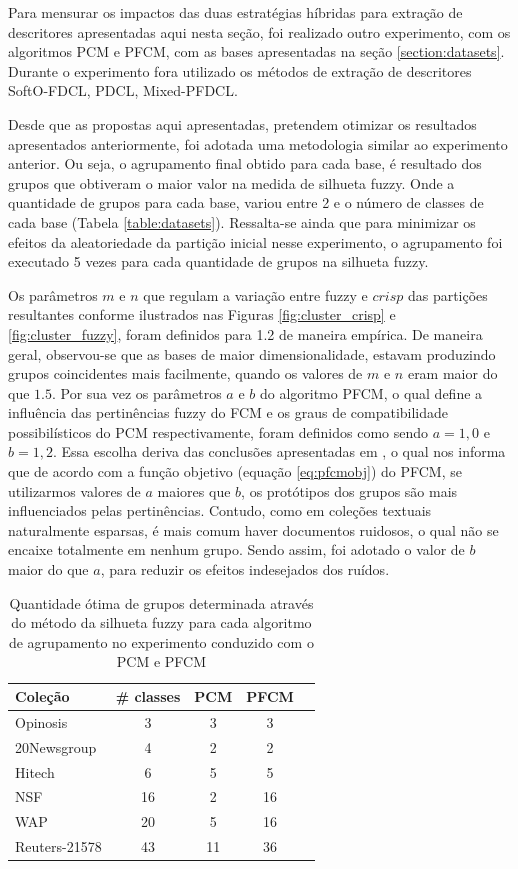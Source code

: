 Para mensurar os impactos das duas estratégias híbridas para extração de descritores apresentadas
aqui nesta seção, foi realizado outro experimento, com os algoritmos PCM e PFCM, com as bases
apresentadas na seção \ref{section:datasets}. Durante o experimento fora utilizado os métodos de
extração de descritores SoftO-FDCL, PDCL, Mixed-PFDCL. 

Desde que as propostas aqui apresentadas, pretendem otimizar os resultados apresentados
anteriormente, foi adotada uma metodologia similar ao experimento anterior. Ou seja, o agrupamento
final obtido para cada base, é resultado dos grupos que obtiveram o maior valor na medida de
silhueta fuzzy. Onde a quantidade de grupos para cada base, variou entre 2 e o número de classes
de cada base (Tabela \ref{table:datasets}). Ressalta-se ainda que para minimizar os efeitos da
aleatoriedade da partição inicial nesse experimento, o agrupamento foi executado 5 vezes para cada
quantidade de grupos na silhueta fuzzy. 

Os parâmetros $m$ e $n$ que regulam a variação entre fuzzy e $crisp$ das partições resultantes
conforme ilustrados nas Figuras \ref{fig:cluster_crisp} e \ref{fig:cluster_fuzzy}, foram definidos
para 1.2 de maneira empírica. De maneira geral, observou-se que as bases de maior dimensionalidade,
estavam produzindo grupos coincidentes mais facilmente, quando os valores de $m$ e $n$ eram maior do
que $1.5$. Por sua vez os parâmetros $a$ e $b$ do algoritmo PFCM, o qual define a influência das
pertinências fuzzy do FCM e os graus de compatibilidade possibilísticos do PCM respectivamente,
foram definidos como sendo $a = 1,0$ e $b = 1,2$. Essa escolha deriva das conclusões apresentadas
em , o qual nos informa que de acordo com a função objetivo (equação
\ref{eq:pfcmobj}) do PFCM, se utilizarmos valores de $a$ maiores que $b$, os protótipos dos grupos
são mais influenciados pelas pertinências. Contudo, como em coleções textuais 
naturalmente esparsas, é mais comum haver documentos ruidosos, o qual não se encaixe totalmente em
nenhum grupo. Sendo assim, foi adotado o valor de $b$ maior do que $a$, para reduzir os efeitos
indesejados dos ruídos.

\begin{table}[!htp]
  \centering
  \begin{tabular}{ |l|c|c|c|c|}
    \hline
    {\bf Coleção} & {\bf \# classes} & {\bf PCM} & {\bf PFCM} \\
    \hline
    Opinosis & 3 &  3 & 3 \\
    \hline
    20Newsgroup & 4 &  2 & 2 \\
    \hline
    Hitech & 6 & 5 & 5 \\
    \hline
    NSF & 16 &  2 & 16 \\
    \hline
    WAP & 20 & 5 & 16 \\
    \hline
    Reuters-21578 & 43 & 11 & 36 \\
    \hline
  \end{tabular}
  \caption{Quantidade ótima de grupos determinada através do método da silhueta fuzzy para cada
  algoritmo de agrupamento no experimento conduzido com o PCM e PFCM}
  \label{table:pfcmclusters}
\end{table}

